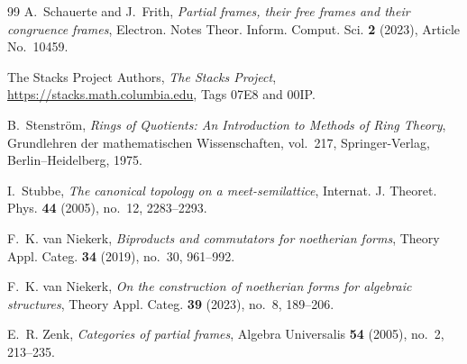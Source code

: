 \documentclass[12pt,oneside,reqno]{amsart}
\theoremstyle{definition}
\theoremstyle{remark}
\begin{document}
\begin{thebibliography}{99}
A.~Schauerte and J.~Frith,
\emph{Partial frames, their free frames and their congruence frames},
Electron. Notes Theor. Inform. Comput. Sci. \textbf{2} (2023),
Article No.~10459.

The Stacks Project Authors,
\emph{The Stacks Project},
\url{https://stacks.math.columbia.edu}, Tags 07E8 and 00IP.

B.~Stenstr\"om,
\emph{Rings of Quotients: An Introduction to Methods of Ring Theory},
Grundlehren der mathematischen Wissenschaften, vol.~217,
Springer-Verlag, Berlin--Heidelberg, 1975.

I.~Stubbe,
\emph{The canonical topology on a meet-semilattice},
Internat. J. Theoret. Phys. \textbf{44} (2005), no.~12, 2283--2293.

F.~K. van Niekerk,
\emph{Biproducts and commutators for noetherian forms},
Theory Appl. Categ. \textbf{34} (2019), no.~30, 961--992.

F.~K. van Niekerk,
\emph{On the construction of noetherian forms for algebraic
structures},
Theory Appl. Categ. \textbf{39} (2023), no.~8, 189--206.

E.~R. Zenk,
\emph{Categories of partial frames},
Algebra Universalis \textbf{54} (2005), no.~2, 213--235.

\end{thebibliography}
\end{document}
